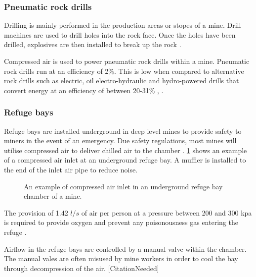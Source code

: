 \subsubsection{Pneumatic rock drills}
Drilling is mainly performed in the production areas or stopes of a mine. Drill machines are used to drill holes into the rock face. Once the holes have been drilled, explosives are then installed to break up the rock \cite{van2008development}.
\par
Compressed air is used to power pneumatic rock drills within a mine. Pneumatic rock drills run at an efficiency of 2\%. This is low when compared to alternative rock drills such as electric, oil electro-hydraulic and hydro-powered drills that convert energy at an efficiency of between 20-31\% \cite{fraser2008saving}, \cite{vanTonder2010Masters}. 
\subsubsection{Refuge bays}
Refuge bays are installed underground in deep level mines to provide safety to miners in the event of an emergency. Due safety regulations, most mines will utilise compressed air to deliver chilled air to the chamber \cite{brake1999criteria}. \cref{fig: Refuge Bay} shows an example of a compressed air inlet at an underground refuge bay. A muffler is installed to the end of the inlet air pipe to reduce noise.
\begin{figure}[h]
	\centering
	\caption{An example of compressed air inlet in an underground refuge bay chamber of a mine.}
	\label{fig: Refuge Bay}
\end{figure}
\par The provision of 1.42 $l/s$ of air per person at a pressure between 200 and 300 \gls{kpa} is required to provide oxygen and prevent any poisonousness gas entering the refuge \cite{brake1999criteria}.\par
Airflow in the refuge bays are controlled by a manual valve within the chamber. The manual vales are often misused by mine workers in order to cool the bay through decompression of the air. [CitationNeeded]
